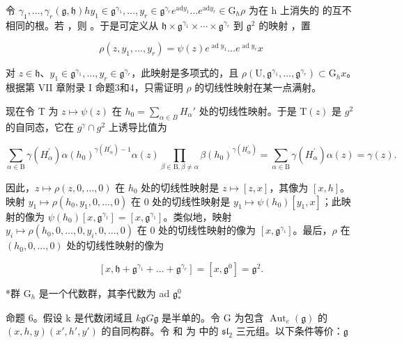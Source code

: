 令 \(\gamma_1, \ldots, \gamma_r\)\((\mathfrak{g}, \mathfrak{h})\)\(h\)\(y_1 \in \mathfrak{g}^{\gamma_1}, \ldots, y_r \in \mathfrak{g}^{\gamma_r}\)\(e^{\mathrm{ad} y_1} \ldots e^{\mathrm{ad} y_r} \in \mathrm{G}_h\)\(\rho\) 为在 h 上消失的  的互不相同的根。若 ，则 。于是可定义从 \(\mathfrak{h} \times \mathfrak{g}^{\gamma_1} \times \cdots \times \mathfrak{g}^{\gamma_r}\) 到 \(\mathfrak{g}^2\) 的映射 ，置

\[
\rho (z, y _ {1}, \dots , y _ {r}) = \psi (z) e ^ {\operatorname{ad} y _ {1}} \dots e ^ {\operatorname{ad} y _ {r}} x
\]

对 \(z \in \mathfrak{h}\)、\(y_1 \in \mathfrak{g}^{\gamma_1}, \ldots, y_r \in \mathfrak{g}^{\gamma_r}\)，此映射是多项式的，且 \(\rho(\mathrm{U}, \mathfrak{g}^{\gamma_1}, \ldots, \mathfrak{g}^{\gamma_r}) \subset \mathrm{G}_h x\)。根据第 VII 章附录 I 命题3和4，只需证明 \(\rho\) 的切线性映射在某一点满射。

现在令 T 为 \(z \mapsto \psi(z)\) 在 \(h_{0} = \sum_{\alpha \in B} H_{\alpha}'\) 处的切线性映射。于是 \(\mathrm{T}(z)\) 是 \(g^{2}\) 的自同态，它在 \(g^{\gamma} \cap g^{2}\) 上诱导比值为

\[
\sum_ {\alpha \in \mathrm{B}} \gamma (H _ {\alpha} ^ {\prime}) \alpha (h _ {0}) ^ {\gamma (H _ {\alpha} ^ {\prime}) - 1} \alpha (z) \prod_ {\beta \in \mathrm{B}, \beta \neq \alpha} \beta (h _ {0}) ^ {\gamma (H _ {\alpha} ^ {\prime})} = \sum_ {\alpha \in \mathrm{B}} \gamma (H _ {\alpha} ^ {\prime}) \alpha (z) = \gamma (z).
\]

因此，\(z \mapsto \rho(z,0,\ldots,0)\) 在 \(h_{0}\) 处的切线性映射是 \(z \mapsto [z,x]\)，其像为 \([x,h]\)。映射 \(y_{1} \mapsto \rho(h_{0},y_{1},0,\ldots,0)\) 在 0 处的切线性映射是 \(y_{1} \mapsto \psi(h_{0})[y_{1},x]\)；此映射的像为 \(\psi(h_{0})[x,\mathfrak{g}^{\gamma_{1}}] = [x,\mathfrak{g}^{\gamma_{1}}]\)。类似地，映射 \(y_{i} \mapsto \rho(h_{0},0,\ldots,0,y_{i},0,\ldots,0)\) 在 0 处的切线性映射的像为 \([x,\mathfrak{g}^{\gamma_{i}}]\)。最后，\(\rho\) 在 \((h_{0},0,\ldots,0)\) 处的切线性映射的像为

\[
[ x, \mathfrak {h} + \mathfrak {g} ^ {\gamma_ {1}} + \dots + \mathfrak {g} ^ {\gamma_ {r}} ] = [ x, \mathfrak {g} ^ {0} ] = \mathfrak {g} ^ {2}.\tag{Q.E.D.}
\]

*群 \(\mathrm{G}_h\) 是一个代数群，其李代数为 ad \(\mathfrak{g}^0_*\)

命题 6。假设 k 是代数闭域且 \(k\)\(\mathfrak{g}\)\(G\)\(\mathfrak{g}\) 是半单的。令 G 为包含 \(\operatorname{Aut}_e(\mathfrak{g})\) 的 \((x, h, y)\)\((x', h', y')\) 的自同构群。令  和  为  中的 \(\mathfrak{sl}_2\) 三元组。以下条件等价：\(\mathfrak{g}\)

